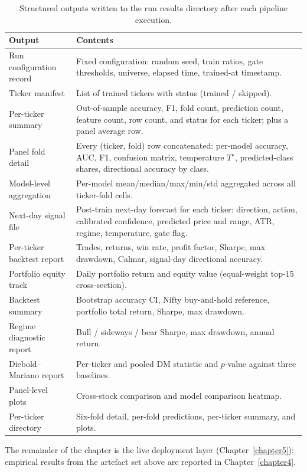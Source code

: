\begin{table}[H]
\centering
\caption{Structured outputs written to the run results directory after each pipeline execution.}
\label{tab:run_artefacts}
\renewcommand{\arraystretch}{1.25}
\footnotesize
\begin{tabularx}{\textwidth}{@{}>{\raggedright\arraybackslash}p{4.7cm} X@{}}
\toprule
\textbf{Output} & \textbf{Contents} \\
\midrule
Run configuration record     & Fixed configuration: random seed, train ratios, gate thresholds, universe, elapsed time, trained-at timestamp. \\
Ticker manifest              & List of trained tickers with status (trained / skipped). \\
Per-ticker summary           & Out-of-sample accuracy, F1, fold count, prediction count, feature count, row count, and status for each ticker; plus a panel average row. \\
Panel fold detail            & Every (ticker, fold) row concatenated: per-model accuracy, AUC, F1, confusion matrix, temperature $T^\star$, predicted-class shares, directional accuracy by class. \\
Model-level aggregation      & Per-model mean/median/max/min/std aggregated across all ticker-fold cells. \\
Next-day signal file         & Post-train next-day forecast for each ticker: direction, action, calibrated confidence, predicted price and range, ATR, regime, temperature, gate flag. \\
Per-ticker backtest report   & Trades, returns, win rate, profit factor, Sharpe, max drawdown, Calmar, signal-day directional accuracy. \\
Portfolio equity track       & Daily portfolio return and equity value (equal-weight top-15 cross-section). \\
Backtest summary             & Bootstrap accuracy CI, Nifty buy-and-hold reference, portfolio total return, Sharpe, max drawdown. \\
Regime diagnostic report     & Bull / sideways / bear Sharpe, max drawdown, annual return. \\
Diebold--Mariano report      & Per-ticker and pooled DM statistic and $p$-value against three baselines. \\
Panel-level plots            & Cross-stock comparison and model comparison heatmap. \\
Per-ticker directory         & Six-fold detail, per-fold predictions, per-ticker summary, and plots. \\
\bottomrule
\end{tabularx}
\end{table}

The remainder of the chapter is the live deployment layer (Chapter~\ref{chapter5}); empirical results from the artefact set above are reported in Chapter~\ref{chapter4}.
